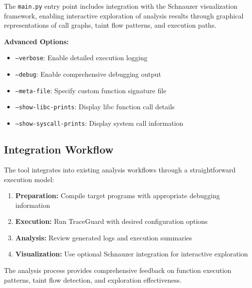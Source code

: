 The \texttt{main.py} entry point includes integration with the Schnauzer visualization framework, enabling interactive exploration of analysis results through graphical representations of call graphs, taint flow patterns, and execution paths.

\textbf{Advanced Options:}
\begin{itemize}
    \item \texttt{--verbose}: Enable detailed execution logging
    \item \texttt{--debug}: Enable comprehensive debugging output
    \item \texttt{--meta-file}: Specify custom function signature file
    \item \texttt{--show-libc-prints}: Display libc function call details
    \item \texttt{--show-syscall-prints}: Display system call information
\end{itemize}

\subsection{Integration Workflow}

The tool integrates into existing analysis workflows through a straightforward execution model:

\begin{enumerate}
    \item \textbf{Preparation:} Compile target programs with appropriate debugging information
    \item \textbf{Execution:} Run TraceGuard with desired configuration options
    \item \textbf{Analysis:} Review generated logs and execution summaries
    \item \textbf{Visualization:} Use optional Schnauzer integration for interactive exploration
\end{enumerate}

The analysis process provides comprehensive feedback on function execution patterns, taint flow detection, and exploration effectiveness.
